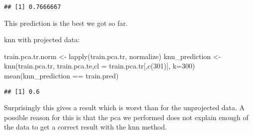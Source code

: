 \documentclass[
]{article}
\newenvironment{Shaded}{\begin{snugshade}}{\end{snugshade}}
\newcommand{\AttributeTok}[1]{\textcolor[rgb]{0.77,0.63,0.00}{#1}}
\newcommand{\DecValTok}[1]{\textcolor[rgb]{0.00,0.00,0.81}{#1}}
\newcommand{\FunctionTok}[1]{\textcolor[rgb]{0.00,0.00,0.00}{#1}}
\newcommand{\NormalTok}[1]{#1}
\newcommand{\OtherTok}[1]{\textcolor[rgb]{0.56,0.35,0.01}{#1}}
\newcommand{\SpecialCharTok}[1]{\textcolor[rgb]{0.00,0.00,0.00}{#1}}
\begin{document}
\begin{verbatim}
## [1] 0.7666667
\end{verbatim}

This prediction is the best we got so far.

knn with projected data:

\begin{Shaded}
\begin{Highlighting}[]
\NormalTok{train.pca.tr.norm }\OtherTok{\textless{}{-}} \FunctionTok{lapply}\NormalTok{(train.pca.tr, normalize)}
\NormalTok{knn\_prediction }\OtherTok{\textless{}{-}} \FunctionTok{knn}\NormalTok{(train.pca.tr, train.pca.te,}\AttributeTok{cl =}\NormalTok{ train.pca.tr[,}\FunctionTok{c}\NormalTok{(}\DecValTok{301}\NormalTok{)], }\AttributeTok{k=}\DecValTok{300}\NormalTok{)}
\FunctionTok{mean}\NormalTok{(knn\_prediction }\SpecialCharTok{==}\NormalTok{ train.pred)}
\end{Highlighting}
\end{Shaded}

\begin{verbatim}
## [1] 0.6
\end{verbatim}

Surprisingly this gives a result which is worst than for the unprojected
data. A possible reason for this is that the pca we performed does not
explain enough of the data to get a correct result with the knn method.
\end{document}
